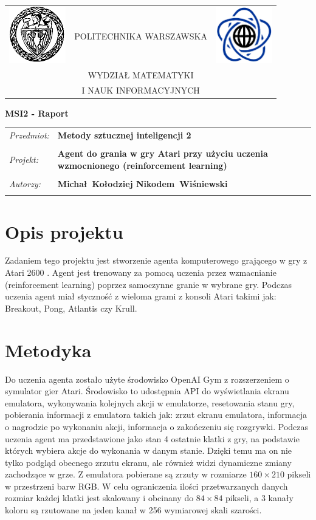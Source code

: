 \documentclass[12pt]{article}
\renewcommand{\maketitle}{
\begin{titlepage}
\begin{table}[t]
\centering
\begin{tabular}[t]{lcr}
 \includegraphics[width=70pt,height=70pt]{PW} & POLITECHNIKA WARSZAWSKA & \includegraphics[width=70pt,height=70pt]{MiNI}\\
& WYDZIAŁ MATEMATYKI & \\
& I NAUK INFORMACYJNYCH &
\end{tabular}
\end{table}
\vspace*{3cm}
  \begin{center}
    \LARGE
    \textbf {MSI2 - Raport}\\
   \vspace*{2 cm}
\begin{table}[!htp]
\begin{tabular}{p{4cm}p{9cm}}
\textit{Przedmiot:} &\textbf {Metody sztucznej inteligencji 2} \\
\\
\textit{Projekt:} &\textbf {Agent do grania w gry Atari przy użyciu uczenia wzmocnionego (reinforcement learning)} \\
\\
\textit{Autorzy:} &\textbf {Michał~Kołodziej \newline Nikodem~Wiśniewski} \\
\\
\end{tabular}
\end{table}

\vspace{5 cm}
  \center{\small Warszawa, dnia \today}
\end{center}
\end{titlepage}
}
\begin{document}
\maketitle


\section{Opis projektu}
Zadaniem tego projektu jest stworzenie agenta komputerowego grającego w gry z Atari 2600 \cite{atari}. Agent jest trenowany za pomocą uczenia przez wzmacnianie (reinforcement learning) poprzez samoczynne granie w wybrane gry. Podczas uczenia agent miał styczność z wieloma grami z konsoli Atari takimi jak: Breakout, Pong, Atlantis czy Krull.

\section{Metodyka}

Do uczenia agenta zostało użyte środowisko OpenAI Gym \cite{gym} z rozszerzeniem o symulator gier Atari. Środowisko to udostępnia API do wyświetlania ekranu emulatora, wykonywania kolejnych akcji w emulatorze, resetowania stanu gry, pobierania informacji z emulatora takich jak: zrzut ekranu emulatora, informacja o nagrodzie po wykonaniu akcji, informacja o zakończeniu się rozgrywki. Podczas uczenia agent ma przedstawione jako stan 4 ostatnie klatki z gry, na podstawie których wybiera akcje do wykonania w danym stanie. Dzięki temu ma on nie tylko podgląd obecnego zrzutu ekranu, ale również widzi dynamiczne zmiany zachodzące w grze. Z emulatora pobierane są zrzuty w rozmiarze $160\times210$ pikseli w przestrzeni barw RGB. W celu ograniczenia ilości przetwarzanych danych rozmiar każdej klatki jest skalowany i obcinany do $84\times84$ pikseli, a 3 kanały koloru są rzutowane na jeden kanał w 256 wymiarowej skali szarości.
\\\
\end{document}
